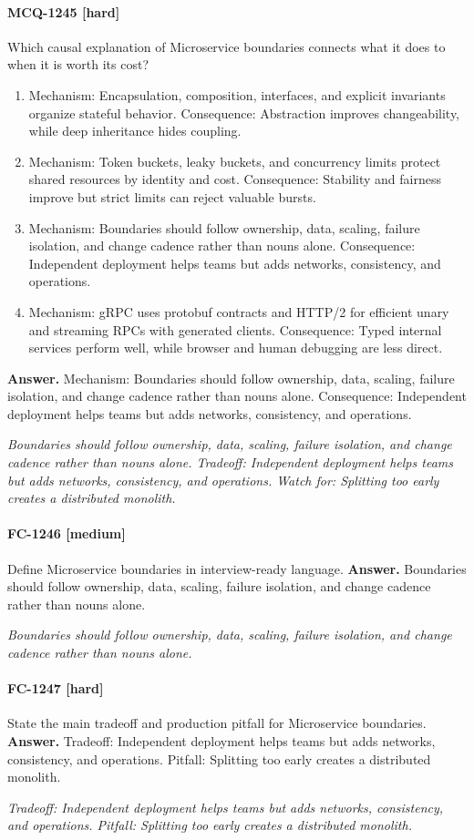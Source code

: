 \paragraph{MCQ-1245 [hard]} Which causal explanation of Microservice boundaries connects what it does to when it is worth its cost?
\begin{enumerate}[label=\Alph*.]
\item Mechanism: Encapsulation, composition, interfaces, and explicit invariants organize stateful behavior. Consequence: Abstraction improves changeability, while deep inheritance hides coupling.
\item Mechanism: Token buckets, leaky buckets, and concurrency limits protect shared resources by identity and cost. Consequence: Stability and fairness improve but strict limits can reject valuable bursts.
\item Mechanism: Boundaries should follow ownership, data, scaling, failure isolation, and change cadence rather than nouns alone. Consequence: Independent deployment helps teams but adds networks, consistency, and operations.
\item Mechanism: gRPC uses protobuf contracts and HTTP/2 for efficient unary and streaming RPCs with generated clients. Consequence: Typed internal services perform well, while browser and human debugging are less direct.
\end{enumerate}
\noindent\textbf{Answer.} Mechanism: Boundaries should follow ownership, data, scaling, failure isolation, and change cadence rather than nouns alone. Consequence: Independent deployment helps teams but adds networks, consistency, and operations.
\par\textit{Boundaries should follow ownership, data, scaling, failure isolation, and change cadence rather than nouns alone. Tradeoff: Independent deployment helps teams but adds networks, consistency, and operations. Watch for: Splitting too early creates a distributed monolith.}
\paragraph{FC-1246 [medium]} Define Microservice boundaries in interview-ready language.
\noindent\textbf{Answer.} Boundaries should follow ownership, data, scaling, failure isolation, and change cadence rather than nouns alone.
\par\textit{Boundaries should follow ownership, data, scaling, failure isolation, and change cadence rather than nouns alone.}
\paragraph{FC-1247 [hard]} State the main tradeoff and production pitfall for Microservice boundaries.
\noindent\textbf{Answer.} Tradeoff: Independent deployment helps teams but adds networks, consistency, and operations. Pitfall: Splitting too early creates a distributed monolith.
\par\textit{Tradeoff: Independent deployment helps teams but adds networks, consistency, and operations. Pitfall: Splitting too early creates a distributed monolith.}
